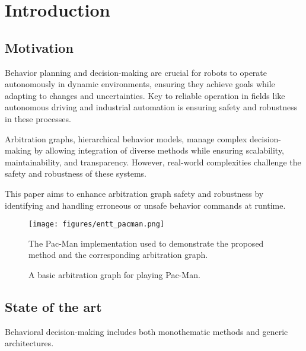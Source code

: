 \section{Introduction}

\subsection{Motivation}

Behavior planning and decision-making are crucial for robots to operate autonomously in dynamic environments, ensuring they achieve goals while adapting to changes and uncertainties.
Key to reliable operation in fields like autonomous driving and industrial automation is ensuring safety and robustness in these processes.

Arbitration graphs, hierarchical behavior models, manage complex decision-making
by allowing integration of diverse methods while ensuring scalability, maintainability, and transparency.
However, real-world complexities challenge the safety and robustness of these systems.

This paper aims to enhance arbitration graph safety and robustness by identifying and handling erroneous or unsafe behavior commands at runtime.

\begin{figure}
    \centering
    \texttt{[image: figures/entt\_pacman.png]}
    \caption{The Pac-Man implementation used to demonstrate the proposed method and the corresponding arbitration graph.}
    \label{fig:entt-pacman}
\end{figure}

\begin{figure}
    \centering
    
    \caption{A basic arbitration graph for playing Pac-Man.}
    \label{fig:pacman-arbitrator-base}
\end{figure}

\subsection{State of the art}
Behavioral decision-making includes both monothematic methods and generic architectures.

